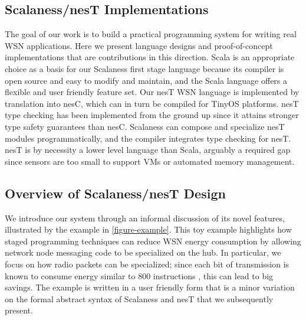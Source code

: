 \subsection{Scalaness/nesT Implementations}

The goal of our work is to build a practical programming system for
writing real WSN applications. Here we present language designs and
proof-of-concept implementations that are contributions in this
direction. Scala is an appropriate choice as a basis for our Scalaness
first stage language because its compiler is open source and easy to
modify and maintain, and the Scala language offers a flexible and
user friendly feature set. 
%
Our nesT WSN language is implemented by translation into nesC,
which can in turn be compiled for TinyOS platforms.
nesT type checking has been implemented from the ground up since it
attains stronger type safety guarantees than nesC.  Scalaness can
compose and specialize nesT modules programmatically, and the compiler
integrates type checking for nesT.  nesT is by necessity a lower level
language than Scala, arguably a required gap since sensors are too small to
support VMs or automated memory management.

\subsection{Overview of Scalaness/nesT Design}

We introduce our system through an informal discussion of its novel
features, illustrated by the example in
\autoref{figure-example}. This toy example highlights how staged
programming techniques can reduce WSN energy consumption by allowing
network node messaging code to be specialized on the hub. In
particular, we focus on how radio packets can be specialized; since
each bit of transmission is known to consume energy similar to 800
instructions \cite{tag}, this can lead to big savings. The example is
written in a user friendly form that is a minor variation on the
formal abstract syntax of Scalaness and nesT that we subsequently present.

